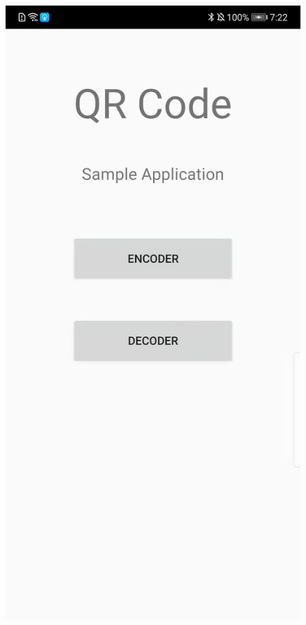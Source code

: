 \documentclass[12pt, a4paper]{article}
\theoremstyle{definition}
\begin{document}
\begin{figure}[htbp]
	\centering
		\begin{minipage}[t]{0.2\linewidth}
		\centering
		\includegraphics[width=\linewidth]{6-1.jpeg}

\end{minipage}
\end{figure}
\end{document}
